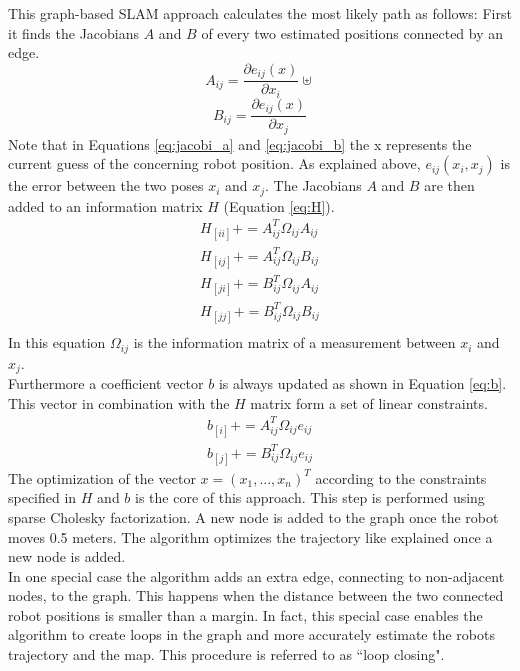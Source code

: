 \documentclass{ba-kecs}
\begin{document}
This graph-based SLAM approach calculates the most likely path as follows:
First it finds the Jacobians \(A\) and \(B\) of every two estimated positions connected by an edge.
\begin{equation}
\label{eq:jacobi_a}
	A_{ij} = \frac{\partial e_{ij}(x)}{\partial x_i}\uplus
\end{equation}
\begin{equation}
\label{eq:jacobi_b}
	B_{ij} = \frac{\partial e_{ij}(x)}{\partial x_j}
\end{equation}
Note that in Equations \ref{eq:jacobi_a} and \ref{eq:jacobi_b} the x represents the current guess of the concerning robot position. As explained above, \(e_{ij}(x_i, x_j)\) is the error between the two poses \(x_i\) and \(x_j\). The Jacobians \(A\) and \(B\) are then added to an information matrix \(H\) (Equation \ref{eq:H}).
\begin{equation}
\label{eq:H}
\begin{aligned}
	H_{[ii]} += A^{T}_{ij} \Omega_{ij} A_{ij} \\
	H_{[ij]} += A^{T}_{ij} \Omega_{ij} B_{ij} \\
	H_{[ji]} += B^{T}_{ij} \Omega_{ij} A_{ij} \\
	H_{[jj]} += B^{T}_{ij} \Omega_{ij} B_{ij} \\
\end{aligned}
\end{equation}
In this equation $\Omega_{ij}$ is the information matrix of a measurement between \(x_i\) and \(x_j\).
\\
Furthermore a coefficient vector \(b\) is always updated as shown in Equation \ref{eq:b}. This vector in combination with the \(H\) matrix form a set of linear constraints.
\begin{equation}
\label{eq:b}
\begin{aligned}
	b_{[i]} += A^{T}_{ij} \Omega_{ij} e_{ij} \\
	b_{[j]} += B^{T}_{ij} \Omega_{ij} e_{ij} 
\end{aligned}
\end{equation}
The optimization of the vector \(x = (x_1, ..., x_n)^T \) according to the constraints specified in \(H\) and \(b\) is the core of this approach. This step is performed using sparse Cholesky factorization. 
A new node is added to the graph once the robot moves 0.5 meters. The algorithm optimizes the trajectory like explained once a new node is added.\\
In one special case the algorithm adds an extra edge, connecting to non-adjacent nodes, to the graph. This happens when the distance between the two connected robot positions is smaller than a margin. In fact, this special case enables the algorithm to create loops in the graph and more accurately estimate the robots trajectory and the map. This procedure is referred to as ``loop closing". 
\end{document}
